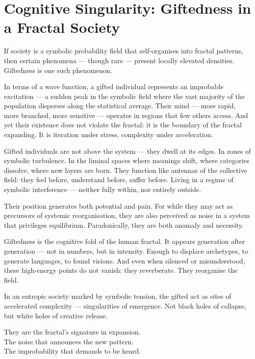 \section{Cognitive Singularity: Giftedness in a Fractal Society}

If society is a symbolic probability field that self-organises into fractal patterns, then certain phenomena — though rare — present locally elevated densities. Giftedness is one such phenomenon.

In terms of a wave function, a gifted individual represents an improbable excitation — a sudden peak in the symbolic field where the vast majority of the population disperses along the statistical average. Their mind — more rapid, more branched, more sensitive — operates in regions that few others access. And yet their existence does not violate the fractal: it is the boundary of the fractal expanding. It is iteration under stress, complexity under acceleration.

Gifted individuals are not above the system — they dwell at its edges. In zones of symbolic turbulence. In the liminal spaces where meanings shift, where categories dissolve, where new layers are born. They function like antennas of the collective field: they feel before, understand before, suffer before. Living in a regime of symbolic interference — neither fully within, nor entirely outside.

Their position generates both potential and pain. For while they may act as precursors of systemic reorganisation, they are also perceived as noise in a system that privileges equilibrium. Paradoxically, they are both anomaly and necessity.

Giftedness is the cognitive fold of the human fractal. It appears generation after generation — not in numbers, but in intensity. Enough to displace archetypes, to generate languages, to found visions. And even when silenced or misunderstood, these high-energy points do not vanish: they reverberate. They reorganise the field.

In an entropic society marked by symbolic tension, the gifted act as sites of accelerated complexity — singularities of emergence. Not black holes of collapse, but white holes of creative release.

They are the fractal’s signature in expansion.\\
The noise that announces the new pattern.\\
The improbability that demands to be heard.

